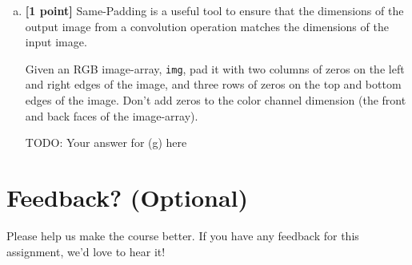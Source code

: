 \begin{enumerate}[(a)]
    \item \textbf{[1 point]} Same-Padding is a useful tool to ensure that the dimensions of the output image from a convolution operation matches the dimensions of the input image. 
    
    \begin{tcolorbox}[colback=orange!5!white,colframe=orange!75!black]
    Given an RGB image-array, \texttt{img}, pad it with two columns of zeros on the left and right edges of the image, and three rows of zeros on the top and bottom edges of the image. Don't add zeros to the color channel dimension (the front and back faces of the image-array).
    \end{tcolorbox}
    
    \begin{mdframed}
        TODO: Your answer for (g) here
    \end{mdframed}
    
\end{enumerate}





\pagebreak
\section*{Feedback? (Optional)}
Please help us make the course better. If you have any feedback for this assignment, we'd love to hear it!


